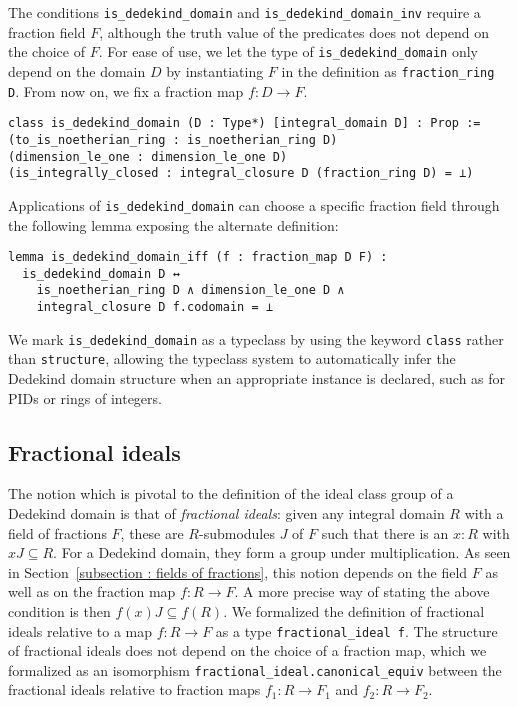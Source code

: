 \documentclass[a4paper,USenglish,cleveref, autoref, thm-restate]{lipics-v2021}
\newcommand{\lean}[1]{\texttt{#1}\xspace} %
\begin{document}
The conditions \lean{is\_dedekind\_domain} and \lean{is\_dedekind\_domain\_inv} require a fraction field $F$,
although the truth value of the predicates does not depend on the choice of $F$.
For ease of use, we let the type of \lean{is\_dedekind\_domain} only depend on the domain $D$
by instantiating $F$ in the definition as \lean{fraction\_ring D}. From now on, we fix a fraction map $f\colon D\to F$.
\begin{lstlisting}
class is_dedekind_domain (D : Type*) [integral_domain D] : Prop :=
(to_is_noetherian_ring : is_noetherian_ring D)
(dimension_le_one : dimension_le_one D)
(is_integrally_closed : integral_closure D (fraction_ring D) = ⊥)
\end{lstlisting}
Applications of \lean{is\_dedekind\_domain} can choose a specific fraction field through the following lemma exposing the alternate definition:
\begin{lstlisting}
lemma is_dedekind_domain_iff (f : fraction_map D F) :
  is_dedekind_domain D ↔
    is_noetherian_ring D ∧ dimension_le_one D ∧
    integral_closure D f.codomain = ⊥
\end{lstlisting}

We mark \lean{is\_dedekind\_domain} as a typeclass by using the keyword \lean{class} rather than \lean{structure},
allowing the typeclass system to automatically infer the Dedekind domain structure when an appropriate instance is declared, such as for PIDs or rings of integers.

\subsection{Fractional ideals}\label{subsection:frac_ideals}
The notion which is pivotal to the definition of the ideal class group of a Dedekind domain is that of \emph{fractional ideals}: given any integral domain $R$ with a field of fractions $F$, these are 
$R$-submodules $J$ of $F$ such that there is an $x : R$ with $x J \subseteq R$. %
For a Dedekind domain, they form a group under multiplication. As seen in Section~\ref{subsection : fields of fractions}, this notion depends on the field $F$ as well as on the fraction map $f\colon R\to F$. A more precise way of stating the above condition is then 
$f(x)J\subseteq f(R)$. We formalized the definition of fractional ideals relative to a map $f\colon R\to F$ as a type \lean{fractional\_ideal f}. 
The structure of fractional ideals does not depend on the choice of a fraction map, which we formalized as an isomorphism \lean{fractional\_ideal.canonical\_equiv} between the fractional ideals relative to fraction maps $f_1\colon R\to F_1$ and $f_2\colon R\to F_2$.
\end{document}
